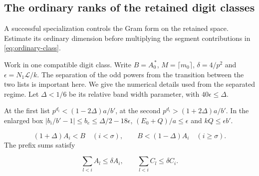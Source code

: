 \subsection{The ordinary ranks of the retained digit classes}
\label{sec:retained-rank}
\hypertarget{source-retained-rank}{}

A successful specialization controls the Gram form on the retained space. Estimate its ordinary dimension before multiplying the segment contributions in \eqref{eq:ordinary-class}.
\begin{established}\label{hyp:retained-digit-degrees}
Work in one compatible digit class. Write \(B=A_0^{\,*}\),
\(M=\lceil m_0\rceil\), \(\delta=4/p^2\) and
\(\epsilon=N_1\mathcal L/k\). The separation of the odd powers
from the transition between the two lists is important here.
We give the numerical details used from the separated regime.
Let \(\Delta<1/6\) be its relative band width parameter, with
\(40\epsilon\le\Delta\).

At the first list
\(p^{d_i}<(1-2\Delta)a/b'\), at the second
\(p^{d_i}>(1+2\Delta)a/b'\). In the enlarged box
\(|b_i/b'-1|\le b_e\le\Delta/2-18\epsilon\),
\((E_0+Q)/a\le\epsilon\) and \(kQ\le\epsilon b'\).

\begin{equation}\label{eq:coarse-split}
 (1+\Delta)A_i<B\quad(i<\sigma),\qquad
 B<(1-\Delta)A_i\quad(i\ge\sigma).
\end{equation}
The prefix sums satisfy

\begin{equation}\label{eq:coarse-prefix}
 \sum_{l<i} A_l\le\delta A_i,\qquad
 \sum_{l<i} C_l\le\delta C_i .
\end{equation}
\end{established}
